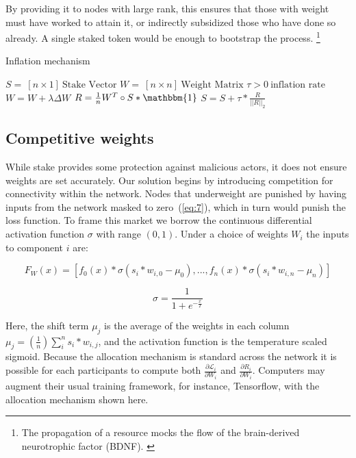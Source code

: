 \documentclass{article}
\begin{document}
By providing it to nodes with large rank, this ensures that those with weight must have worked to attain it, or indirectly subsidized those who have done so already. A single staked token would be enough to bootstrap the process. \footnote{The propagation of a resource mocks the flow of the brain-derived neurotrophic factor (BDNF). \cite{Bathina1989neurotrophin}} 
\smallskip

\begin{algorithm}
	\caption{Inflation mechanism}
	\begin{algorithmic} 
		
		\REQUIRE $S = \ [n \times 1] \ \textrm{Stake Vector}$
		\REQUIRE $W = \ [n \times n] \ \textrm{Weight Matrix}$
		\REQUIRE $\tau > 0 \ \textrm{inflation rate}$
		\STATE $W = W + \lambda \Delta W$
		\STATE $R = \frac{1}{n} W^T \circ S * \mathbbm{1}$
		\STATE $S = S + \tau * \frac{R}{||R||_2}  $
		\ENDWHILE
	\end{algorithmic}
\end{algorithm}
\smallskip

\subsection{Competitive weights}
\label{sec:competitive_weights}
While stake provides some protection against malicious actors, it does not ensure weights are set accurately. Our solution begins by introducing competition for connectivity within the network. Nodes that underweight are punished by having inputs from the network masked to zero~(\ref{eq:7}), {\color{blue} which in turn would punish the loss function}. To frame this market we borrow the continuous differential activation function $\sigma$ with range $(0,1)$. Under a choice of weights $W_i$ the inputs to component $i$ are:
\bigskip

\begin{equation}
\label{eq:7}
F_W(x) =  [f_0(x) * \sigma(s_i * w_{i,0} - \mu_0),  ... , f_n(x) * \sigma(s_i * w_{i,n} - \mu_n)]
\end{equation}

\begin{equation}
\sigma =  \frac{1}{ 1 + e^{-\frac{x}{T}} }
\end{equation}

Here, the shift term $\mu_j$ is the average of the weights in each column $\mu_j = (\frac{1}{n}) \sum_{i}^{n}{s_i * w_{i,j}}$, and the activation function is the temperature scaled sigmoid. Because the allocation mechanism is standard across the network it is possible for each participants to compute both $\frac{\partial \mathcal{L}_i}{\partial W_i}$ and $\frac{\partial R_i}{\partial W_i}$. Computers may augment their usual training framework, for instance, Tensorflow, with the allocation mechanism shown here. 
\bigskip
\end{document}
